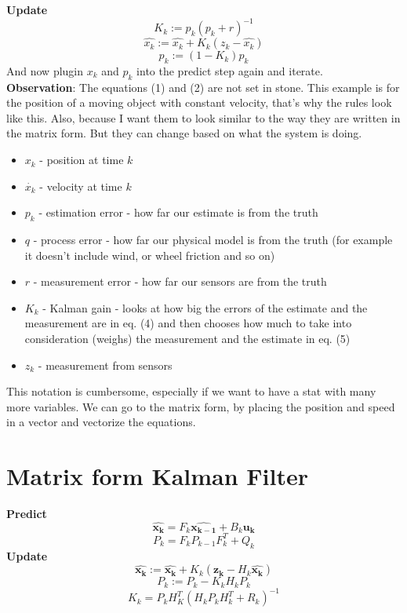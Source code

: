 \documentclass{article}
\begin{document}
\textbf{Update}
\begin{equation}
    K_k := p_k(p_k + r)^{-1}
\end{equation}
\begin{equation}
    \hat{x_k} := \hat{x_k} + K_k(z_k - \hat{x_k})
\end{equation}
\begin{equation}
    p_k := (1-K_k)p_k
\end{equation}
And now plugin $x_k$ and $p_k$ into the predict step again and iterate.\\
\textbf{Observation}: The equations (1) and (2) are not set in stone. This example is for the position of a moving object with constant velocity, that's why the rules look like this. Also, because I want them to look similar to the way they are written in the matrix form. But they can change based on what the system is doing. 

\begin{itemize}
    \item $x_k$ - position at time $k$
    \item $\dot{x_k}$ - velocity at time $k$
    \item $p_k$ - estimation error - how far our estimate is from the truth
    \item $q$ - process error - how far our physical model is from the truth (for example it doesn't include wind, or wheel friction and so on)
    \item $r$ - measurement error - how far our sensors are from the truth
    \item $K_k$ - Kalman gain - looks at how big the errors of the estimate and the measurement are in eq. (4) and then chooses how much to take into consideration (weighs) the measurement and the estimate in eq. (5)
    \item $z_k$ - measurement from sensors
\end{itemize}
This notation is cumbersome, especially if we want to have a stat with many more variables. We can go to the matrix form, by placing the position and speed in a vector and vectorize the equations.

\section{Matrix form Kalman Filter}
\textbf{Predict}
\begin{equation}
    \bm{\hat{x_k}} = F_k\bm{\hat{x_{k-1}}} + B_k\bm{u_k}
\end{equation}
\begin{equation}
    P_k = F_kP_{k-1}F_k^T + Q_k
\end{equation}
\textbf{Update}
\begin{equation}
    \bm{\hat{x_k}} := \bm{\hat{x_k}} + K_k(\bm{z_k}-H_k\bm{\hat{x_k}})
\end{equation}
\begin{equation}
    P_k := P_k - K_kH_kP_k
\end{equation}
\begin{equation}
    K_k = P_kH_K^T(H_kP_kH_k^T + R_k)^{-1}
\end{equation}
\end{document}
